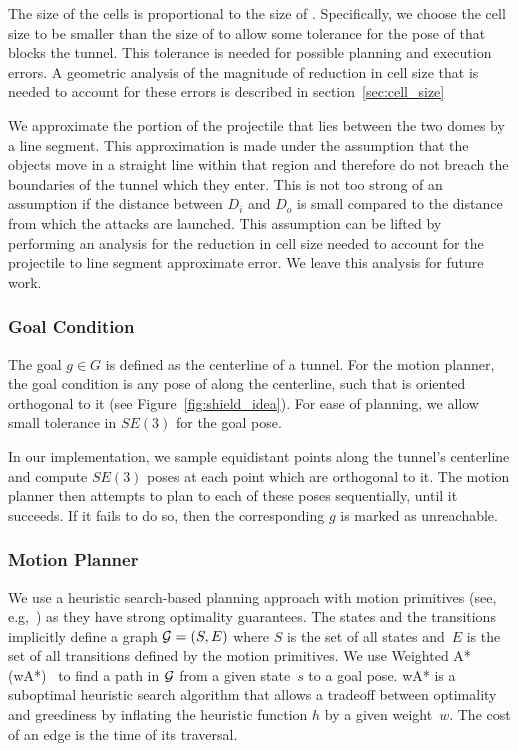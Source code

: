 \documentclass[a4paper]{report}
\begin{document}
%
The size of the cells is proportional to the size of \calS. Specifically, we choose the cell size to be smaller than the size of \calS to allow some tolerance for the pose of \calS that blocks the tunnel. This tolerance is needed for possible planning and execution errors.
%
A geometric analysis of the magnitude of reduction in cell size that is needed to account for these errors is described in section~\ref{sec:cell_size}

We approximate the portion of the projectile that lies between the two domes by a line segment. This approximation is made under the assumption that the objects move in a straight line within that region and therefore do not breach the boundaries of the tunnel which they enter. This is not too strong of an assumption if the distance between $D_i$ and $D_o$ is small compared to the distance from which the attacks are launched.
This assumption can be lifted by performing an analysis for the reduction in cell size needed to account for the projectile to line segment approximate error. We leave this analysis for future work.
%

\subsubsection{Goal Condition}
The goal $g \in G$ is defined as the centerline of a tunnel. For the motion planner, the goal condition is any pose of \calS along the centerline, such that \calS is oriented orthogonal to it (see Figure~\ref{fig:shield_idea}). For ease of planning, we allow small tolerance in $SE(3)$ for the goal pose.

In our implementation, we sample equidistant points along the tunnel's centerline and compute $SE(3)$ poses at each point which are orthogonal to it. The motion planner then attempts to plan to each of these poses sequentially, until it succeeds. If it fails to do so, then the corresponding $g$ is marked as unreachable.
 
\subsubsection{Motion Planner}
We use a heuristic search-based planning approach with motion primitives (see, e.g,~\cite{CCL10,CSCL11,LF09})
as they have strong optimality guarantees.
The states and the transitions implicitly define a graph $\mathcal{G} = (S,E)$ where $S$ is the set of all states and~$E$ is the set of all transitions defined by the motion primitives. We use Weighted A* (wA*)~\cite{pohl1970heuristic} to find a path in $\mathcal{G}$ from a given state~$s$ to a goal pose. 
wA* is a suboptimal heuristic search algorithm that allows a tradeoff between optimality and greediness by inflating the heuristic function $h$ by a given weight~$w$. The cost of an edge is the time of its traversal.
\end{document}
